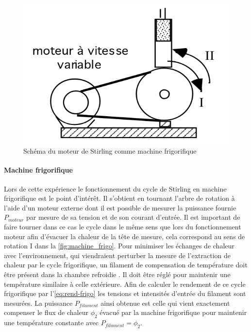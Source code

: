 \begin{figure}
    \centering
    \vspace{-1cm}
    \includegraphics[width=\linewidth]{figures/machine-frigo.png}
    \caption{Schéma du moteur de Stirling comme machine frigorifique \cite{notice}}
    \label{fig:machine_frigo}
    \vspace{-0.5cm}
\end{figure}

\paragraph*{Machine frigorifique}
Lors de cette expérience le fonctionnement du cycle de Stirling en machine frigorifique est le point d'intérêt. Il s'obtient en tournant l'arbre de rotation à l'aide d'un moteur externe dont il est possible de mesurer la puissance fournie \(P_{moteur}\) par mesure de sa tension et de son courant d'entrée. Il est important de faire tourner dans ce cas le cycle dans le même sens que lors du fonctionnement moteur afin d'évacuer la chaleur de la tête de mesure, cela correspond au sens de rotation I dans la \autoref{fig:machine_frigo}. Pour minimiser les échanges de chaleur avec l'environnement, qui viendraient perturber la mesure de l'extraction de chaleur par le cycle frigorifique, un filament de compensation de température doit être présent dans la chambre refroidie \cite{notice}. Il doit être réglé pour maintenir une température similaire à celle extérieure. Afin de calculer le rendement de ce cycle frigorifique par l'\autoref{eq:rend-frigo} les tensions et intensités d'entrée du filament sont mesurées. La puissance \(P_{filament}\) ainsi obtenue est celle qui vient exactement compenser le flux de chaleur \(\phi_2\) évacué par la machine frigorifique pour maintenir une température constante avec \(P_{filament} = \phi_2\).
